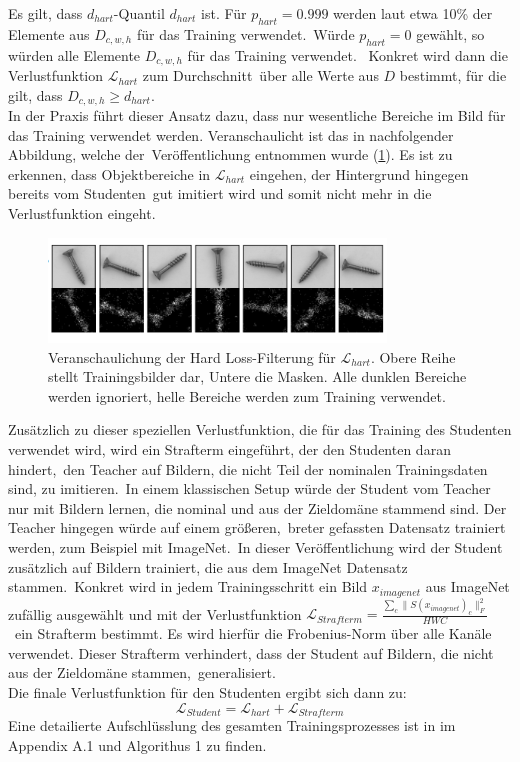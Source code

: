 Es gilt, dass $d_{hart}$-Quantil $d_{hart}$ ist. Für $p_{hart}=\num{0,999}$ werden laut \cite{efficientad} etwa 10\% der Elemente aus $D_{c,w,h}$ für das Training verwendet.\
Würde $p_{hart}=0$ gewählt, so würden alle Elemente $D_{c,w,h}$ für das Training verwendet. \ Konkret wird dann die Verlustfunktion $\mathcal{L}_{hart}$ zum Durchschnitt\
über alle Werte aus $D$ bestimmt, für die gilt, dass $D_{c,w,h} \geq d_{hart}$.\\
In der Praxis führt dieser Ansatz dazu, dass nur wesentliche Bereiche im Bild für das Training verwendet werden. Veranschaulicht ist das in nachfolgender Abbildung, welche der\
Veröffentlichung entnommen wurde (\ref{fig:hardthreshold}). Es ist zu erkennen, dass Objektbereiche in $\mathcal{L}_{hart}$ eingehen, der Hintergrund hingegen bereits vom Studenten\
gut imitiert wird und somit nicht mehr in die Verlustfunktion eingeht.\\
\begin{figure}[h]
    \centering
    \includegraphics[width=0.8\textwidth]{bilder/hardloss.png}
    \caption{Veranschaulichung der \glqq Hard Loss\grqq{}-Filterung für $\mathcal{L}_{hart}$. Obere Reihe stellt Trainingsbilder dar, Untere die Masken. Alle dunklen Bereiche werden ignoriert, helle Bereiche werden zum Training verwendet. \cite{efficientad}}
    \label{fig:hardthreshold}
\end{figure}
Zusätzlich zu dieser speziellen Verlustfunktion, die für das Training des Studenten verwendet wird, wird ein Strafterm eingeführt, der den Studenten daran hindert,\
den Teacher auf Bildern, die nicht Teil der nominalen Trainingsdaten sind, zu imitieren.\ 
In einem klassischen Setup würde der Student vom Teacher nur mit Bildern lernen, die nominal und aus der Zieldomäne stammend sind. Der Teacher hingegen würde auf einem größeren,\ 
breter gefassten Datensatz trainiert werden, zum Beispiel mit ImageNet.\ 
In dieser Veröffentlichung wird der Student zusätzlich auf Bildern trainiert, die aus dem ImageNet Datensatz stammen.\
Konkret wird in jedem Trainingsschritt ein Bild $x_{imagenet}$ aus ImageNet zufällig ausgewählt und mit der Verlustfunktion $\mathcal{L}_{Strafterm}=\frac{\sum_{c}\lVert S(x_{imagenet})_{c} \rVert^{2}_{F}}{HWC}$\ 
ein Strafterm bestimmt. Es wird hierfür die Frobenius-Norm über alle Kanäle verwendet. Dieser Strafterm verhindert, dass der Student auf Bildern, die nicht aus der Zieldomäne stammen,\
generalisiert.\\
Die finale Verlustfunktion für den Studenten ergibt sich dann zu:\
$$
\mathcal{L}_{Student}= \mathcal{L}_{hart} + \mathcal{L}_{Strafterm} %
$$
Eine detailierte Aufschlüsslung des gesamten Trainingsprozesses ist in \cite{efficientad} im Appendix A.1 und Algorithus 1 zu finden.\\
